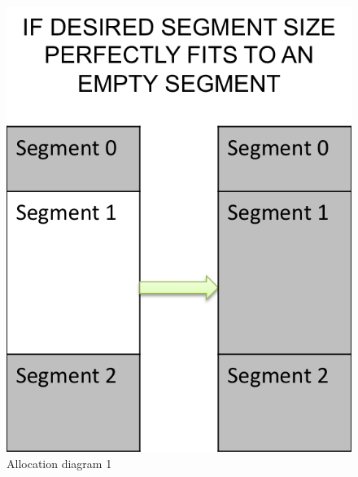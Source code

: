 \documentclass[conference]{IEEEtran}
\begin{document}
\begin{figure}[!hbp]
  \centering
  \begin{minipage}[b]{0.20\textwidth}
    \includegraphics[width=\linewidth]{allocation/allocation1.png}
  	\caption{Allocation diagram 1}
  	\label{fig:alloc1}
  \end{minipage}
  \hspace{0.1in}
  \begin{minipage}[b]{0.20\textwidth}

\end{minipage}
\end{figure}
\end{document}
